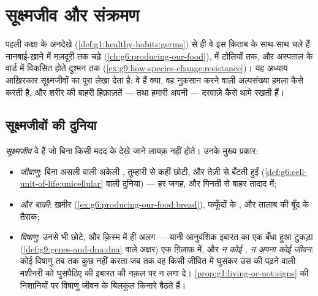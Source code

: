 \chapter{सूक्ष्मजीव और संक्रमण}\label{ch:g9:microbes-and-infection}

पहली कक्षा के अनदेखे  (\cref{def:g1:healthy-habits:germs}) से ही
वे इस किताब के साथ-साथ चले हैं: नानबाई-ख़ाने में मज़दूरी तक चढ़े
(\cref{ch:g6:producing-our-food}),  में  टोलियों तक, और
अस्पताल के वार्ड में विकसित होते दुश्मन तक
(\cref{ex:g9:how-species-change:resistance})। यह अध्याय आख़िरकार
सूक्ष्मजीवों का पूरा लेखा देता है: वे हैं क्या, वह नुक़सान करने वाली
अल्पसंख्या हमला कैसे करती है, और शरीर की बाहरी हिफ़ाज़तें --- तथा हमारी
अपनी --- दरवाज़े कैसे थामे रखती हैं।

\section{सूक्ष्मजीवों की दुनिया}

\begin{definition}[सूक्ष्मजीव, छँटे हुए]\label{def:g9:microbes-and-infection:sorted}
\emph{सूक्ष्मजीव} वे  हैं जो बिना किसी मदद के
देखे जाने लायक़ नहीं होते। उनके मुख्य प्रकार:
\begin{itemize}
  \item \emph{जीवाणु}: बिना असली  वाली अकेली
        , तुम्हारी  से कहीं छोटी, और तेज़ी से बँटती
        हुईं (\cref{def:g6:cell-unit-of-life:unicellular} वाली दुनिया)
        --- हर जगह, और गिनती से बाहर तादाद में;
  \item \emph{  और बाक़ी}: ख़मीर
        (\cref{ex:g6:producing-our-food:bread}), फफूँदों के , और
        तालाब की बूँद के तैराक;
  \item \emph{विषाणु}: उनसे भी छोटे, और क़िस्म में ही
        अलग --- यानी आनुवंशिक इबारत का एक बँधा हुआ टुकड़ा
        (\cref{def:g9:genes-and-dna:dna} वाले अक्षर) एक ग़िलाफ़ में,
        और \emph{न कोई , न अपना कोई जीवन}: कोई विषाणु तब तक कुछ
        नहीं करता जब तक वह किसी जीवित  में घुसकर उस  की
        पढ़ने वाली मशीनरी को घुसपैठिए की इबारत की नक़ल पर न लगा दे।
        \cref{prop:g1:living-or-not:signs} की निशानियों पर विषाणु
        जीवन के बिलकुल किनारे बैठते हैं।
\end{itemize}
\end{definition}

